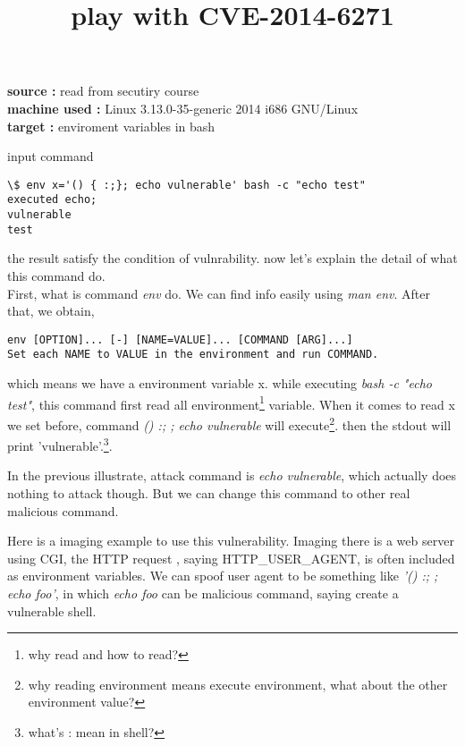 \documentclass{article}
\title{play with CVE-2014-6271}
\begin{document}
\maketitle
\textbf{source : }{read from secutiry course} \\
\textbf{machine used : } Linux 3.13.0-35-generic 2014 i686 GNU/Linux \\
\textbf{target : } enviroment variables in bash

input command
\begin{lstlisting}
\$ env x='() { :;}; echo vulnerable' bash -c "echo test"
executed echo;
vulnerable
test
\end{lstlisting}
the result satisfy the condition of vulnrability. now let's explain the detail of what this command do.\\

First, what is command \textit{env} do. We can find info easily using \textit{man env}. After that, we obtain,
\begin{lstlisting}
env [OPTION]... [-] [NAME=VALUE]... [COMMAND [ARG]...]
Set each NAME to VALUE in the environment and run COMMAND.
\end{lstlisting}

which means we have a environment variable x. while executing \textit{bash -c "echo test"}, this command first read all environment\footnote{why read and how to read?} variable. When it comes to read x we set before, command \textit{(){ :; }; echo vulnerable} will execute\footnote{why reading environment means execute environment, what about the other environment value?}. then the stdout will print 'vulnerable'.\footnote{what's : mean in shell?}. 

In the previous illustrate, attack command is \textit{echo vulnerable}, which actually does nothing to attack though. But we can change this command to other real malicious command. 

Here is a imaging example to use this vulnerability. Imaging there is a web server using CGI, the HTTP request , saying HTTP\_USER\_AGENT, is often included as environment variables. We can spoof user agent to be something like \textit{'() { :; }; echo foo'}, in which \textit{echo foo} can be malicious command, saying create a vulnerable shell. 
\end{document}
